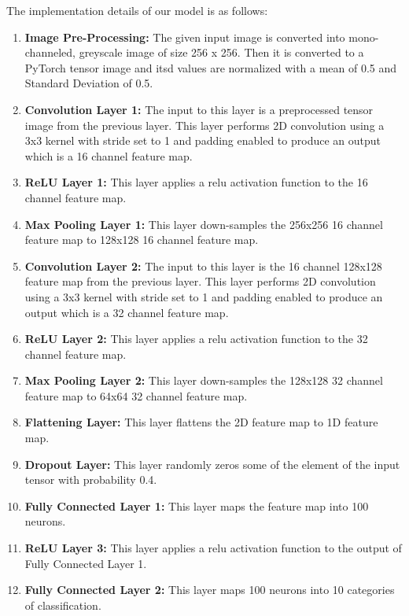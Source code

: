 \documentclass[12pt]{report}
\begin{document}
The implementation details of our model is as follows: 
\begin{enumerate}
	\item \textbf{Image Pre-Processing: } The given input image is converted into mono-channeled, greyscale image of size 256 x 256. Then it is converted to a PyTorch tensor image and itsd values are normalized with a mean of 0.5 and Standard Deviation of 0.5.   
  
	\item \textbf{Convolution Layer 1:} The input to this layer is a preprocessed tensor image from the previous layer. This layer performs 2D convolution using a 3x3 kernel with stride set to 1 and padding enabled to produce an output which is a 16 channel feature map. 
	
	\item \textbf{ReLU Layer 1:} This layer applies a relu activation function to the 16 channel feature map.
	 
	 \item \textbf{Max Pooling Layer 1:} This layer down-samples the 256x256 16 channel feature map to 128x128 16 channel feature map.
	 
	 \item \textbf{Convolution Layer 2:} The input to this layer is the 16 channel 128x128 feature map from the previous layer. This layer performs 2D convolution using a 3x3 kernel with stride set to 1 and padding enabled to produce an output which is a 32 channel feature map. 
	 
	 \item \textbf{ReLU Layer 2:} This layer applies a relu activation function to the 32 channel feature map.
	 
	 \item \textbf{Max Pooling Layer 2:} This layer down-samples the 128x128 32 channel feature map to 64x64 32 channel feature map.
	 
	 \item \textbf{Flattening Layer: } This layer flattens the 2D feature map to 1D feature map. 
	 
	 \item \textbf{Dropout Layer:} This layer randomly zeros some of the element of the input tensor with probability 0.4. 
	 
	 \item \textbf{Fully Connected Layer 1:} This layer maps the feature map into 100 neurons.
	 
	 \item \textbf{ReLU Layer 3:} This layer applies a relu activation function to the output of Fully Connected Layer 1.
	 
	 \item \textbf{Fully Connected Layer 2:} This layer maps 100 neurons into 10 categories of classification.
	 
\end{enumerate}
\end{document}
